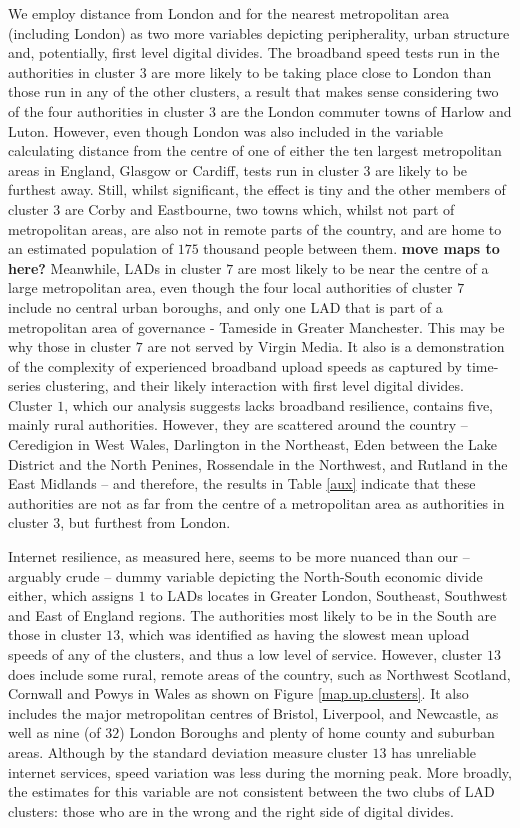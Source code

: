 \documentclass[,]{sagej}
\begin{document}
We employ distance from London and for the nearest metropolitan area
(including London) as two more variables depicting peripherality, urban
structure and, potentially, first level digital divides. The broadband
speed tests run in the authorities in cluster \(3\) are more likely to
be taking place close to London than those run in any of the other
clusters, a result that makes sense considering two of the four
authorities in cluster \(3\) are the London commuter towns of Harlow and
Luton. However, even though London was also included in the variable
calculating distance from the centre of one of either the ten largest
metropolitan areas in England, Glasgow or Cardiff, tests run in cluster
\(3\) are likely to be furthest away. Still, whilst significant, the
effect is tiny and the other members of cluster \(3\) are Corby and
Eastbourne, two towns which, whilst not part of metropolitan areas, are
also not in remote parts of the country, and are home to an estimated
population of \(175\) thousand people between them. \textbf{move maps to
here?} Meanwhile, LADs in cluster \(7\) are most likely to be near the
centre of a large metropolitan area, even though the four local
authorities of cluster \(7\) include no central urban boroughs, and only
one LAD that is part of a metropolitan area of governance - Tameside in
Greater Manchester. This may be why those in cluster \(7\) are not
served by Virgin Media. It also is a demonstration of the complexity of
experienced broadband upload speeds as captured by time-series
clustering, and their likely interaction with first level digital
divides. Cluster \(1\), which our analysis suggests lacks broadband
resilience, contains five, mainly rural authorities. However, they are
scattered around the country -- Ceredigion in West Wales, Darlington in
the Northeast, Eden between the Lake District and the North Penines,
Rossendale in the Northwest, and Rutland in the East Midlands -- and
therefore, the results in Table \ref{aux} indicate that these
authorities are not as far from the centre of a metropolitan area as
authorities in cluster \(3\), but furthest from London.

Internet resilience, as measured here, seems to be more nuanced than our
-- arguably crude -- dummy variable depicting the North-South economic
divide either, which assigns \(1\) to LADs locates in Greater London,
Southeast, Southwest and East of England regions. The authorities most
likely to be in the South are those in cluster \(13\), which was
identified as having the slowest mean upload speeds of any of the
clusters, and thus a low level of service. However, cluster \(13\) does
include some rural, remote areas of the country, such as Northwest
Scotland, Cornwall and Powys in Wales as shown on Figure
\ref{map.up.clusters}. It also includes the major metropolitan centres
of Bristol, Liverpool, and Newcastle, as well as nine (of \(32\)) London
Boroughs and plenty of home county and suburban areas. Although by the
standard deviation measure cluster \(13\) has unreliable internet
services, speed variation was less during the morning peak. More
broadly, the estimates for this variable are not consistent between the
two clubs of LAD clusters: those who are in the wrong and the right side
of digital divides.
\end{document}
